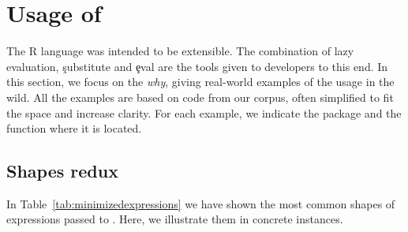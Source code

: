 \documentclass[screen,acmsmall]{acmart}
\begin{document}
\section{Usage of \eval}

The R language was intended to be extensible. The combination of lazy
evaluation, \c{substitute} and \c{eval} are the tools given to developers to
this end. In this section, we focus on the \emph{why}, giving real-world
examples of the \eval usage in the wild. All the examples are based on code from
our corpus, often simplified to fit the space and increase clarity. For each
example, we indicate the package and the function where it is located.

\subsection{Shapes redux}

In Table~\ref{tab:minimizedexpressions} we have shown the most common shapes of
expressions passed to \eval. Here, we illustrate them in concrete instances.
\end{document}
